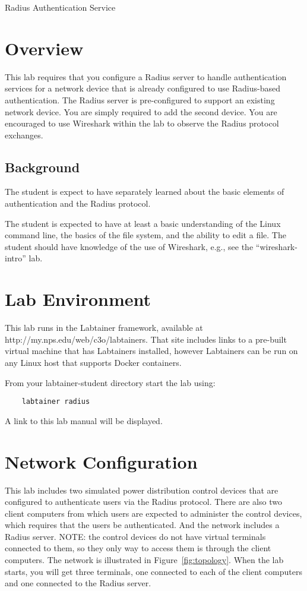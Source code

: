 


\begin{center}
{\LARGE Radius Authentication Service}
\vspace{0.1in}\\
\end{center}

\copyrightnotice

\section{Overview}
This lab requires that you configure a Radius server to handle authentication
services for a network device that is already configured to use Radius-based
authentication.  The Radius server is pre-configured to support an existing
network device.  You are simply required to add the second device.
You are encouraged to use Wireshark within the lab to observe the Radius
protocol exchanges.


\subsection {Background}
The student is expect to have separately learned about the basic elements of authentication
and the Radius protocol.

The student is expected to have at least a basic understanding of the Linux command line,
the basics of the file system, and the ability to edit a file.  The student should have
knowledge of the use of Wireshark, e.g., see the ``wireshark-intro'' lab.

\section{Lab Environment}
This lab runs in the Labtainer framework,
available at http://my.nps.edu/web/c3o/labtainers.
That site includes links to a pre-built virtual machine
that has Labtainers installed, however Labtainers can
be run on any Linux host that supports Docker containers.

From your labtainer-student directory start the lab using:
\begin{verbatim}
    labtainer radius
\end{verbatim}
\noindent A link to this lab manual will be displayed.  

\section{Network Configuration}
This lab includes two simulated power distribution control devices that
are configured to authenticate users via the Radius protocol.  There
are also two client computers from which users are expected to administer
the control devices, which requires that the users be authenticated.
And the network includes a Radius server.  NOTE: the control devices
do not have virtual terminals connected to them, so they only way to 
access them is through the client computers.  The network is
illustrated in Figure~\ref{fig:topology}.
When the lab starts, you will get three terminals, one connected to each
of the client computers and one connected to the Radius server.

